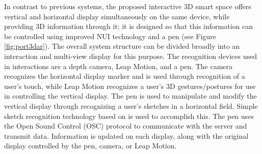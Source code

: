 In contrast to previous systems, the proposed interactive 3D smart space offers vertical and horizontal display simultaneously on the same device, while providing 3D information through it; it is designed so that this information can be controlled using improved NUI technology and a pen (see Figure \ref{fig:port3dar}). The overall system structure can be divided broadly into an interaction and multi-view display for this purpose. The recognition devices used in interactions are a depth camera, Leap Motion, and a pen. The camera recognizes the horizontal display marker and is used through recognition of a user's touch, while Leap Motion recognizes a user's 3D gestures/postures for use in controlling the vertical display. The pen is used to manipulate and modify the vertical display through recognizing a user's sketches in a horizontal field. Simple sketch recognition technology based on \cite{wobbrock_gestures_2007} is used to accomplish this. The pen uses the Open Sound Control (OSC) protocol to communicate with the server and transmit data. Information is updated on each display, along with the original display controlled by the pen, camera, or Leap Motion.

